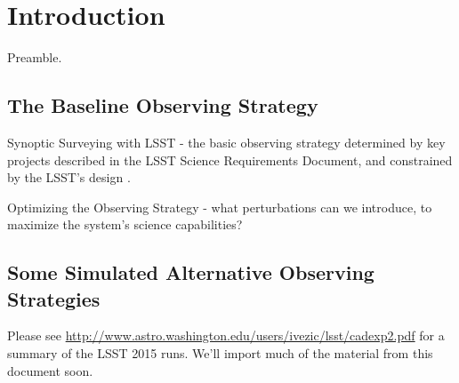 
\chapter[Introduction]{Introduction}
\label{chp:intro}


Preamble.

\section{The Baseline Observing Strategy}

Synoptic Surveying with LSST - the basic observing strategy determined
by key projects described in the LSST Science Requirements Document,
and constrained by the LSST's design \citep{IvezicEtal2008}.

Optimizing the Observing Strategy - what perturbations can we
introduce, to maximize the system's science capabilities?


\section{Some Simulated Alternative Observing Strategies}


Please see
\url{http://www.astro.washington.edu/users/ivezic/lsst/cadexp2.pdf}
for a summary of the LSST 2015 \OpSim runs. We'll import much of the
material from this document soon.
